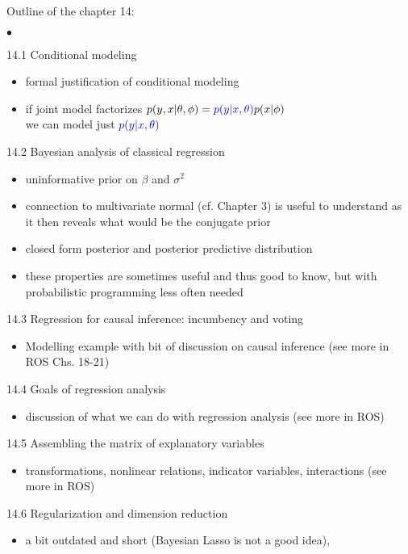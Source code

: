 \documentclass[a4paper,11pt]{article}
\begin{document}
Outline of the chapter 14:
\begin{list}{$\bullet$}{\parsep=0pt\itemsep=2pt}
\item[14.1] Conditional modeling
  \begin{itemize}
  \item formal justification of conditional modeling
  \item if joint model factorizes $p(y,x|\theta,\phi)={\color{blue}p(y|x,\theta)}p(x|\phi)$\\
    we can model just ${\color{blue}p(y|x,\theta)}$
  \end{itemize}
\item[14.2] Bayesian analysis of classical regression
  \begin{itemize}
  \item uninformative prior on $\beta$ and $\sigma^2$
  \item connection to multivariate normal (cf. Chapter 3) is useful to understand as it then reveals what would be the conjugate prior
  \item closed form posterior and posterior predictive distribution
  \item these properties are sometimes useful and thus good to know,
    but with probabilistic programming less often needed
  \end{itemize}
\item[14.3] Regression for causal inference: incumbency and voting
  \begin{itemize}
  \item Modelling example with bit of discussion on causal inference
    (see more in ROS Chs. 18-21)
  \end{itemize}
\item[14.4] Goals of regression analysis
  \begin{itemize}
  \item discussion of what we can do with regression analysis (see
    more in ROS)
  \end{itemize}
\item[14.5] Assembling the matrix of explanatory variables
  \begin{itemize}
  \item transformations, nonlinear relations, indicator variables,
    interactions (see more in ROS)
  \end{itemize}
\item[14.6] Regularization and dimension reduction
  \begin{itemize}
  \item a bit outdated and short (Bayesian Lasso is not a good idea),

\end{itemize}
\end{list}
\end{document}
